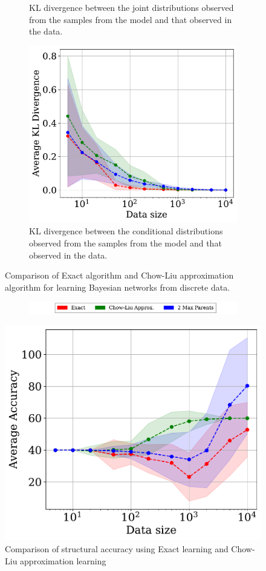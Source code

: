 \begin{figure}[htp!]
\begin{subfigure}{0.32\textwidth}
         \caption{KL divergence between the joint distributions observed from the samples from the model and that observed in the data.}
         \label{fig:kl_div_joint}
     \end{subfigure}
     \hfill
     \begin{subfigure}{0.32\textwidth}
         \centering
         \includegraphics[width=\textwidth]{plots/conditionals_kl_divergence.pdf}
         \caption{KL divergence between the conditional distributions observed from the samples from the model and that observed in the data.}
         \label{fig:kl_div_marginals}
     \end{subfigure}
        \caption{Comparison of Exact algorithm and Chow-Liu approximation algorithm for learning Bayesian networks from discrete data.}
        \label{fig:str_learning_comp}
\end{figure}

\begin{figure}[htp!]
\begin{subfigure}{0.7\textwidth}
         \centering
    \includegraphics[width=\textwidth]{plots/legends.pdf}
     \end{subfigure}
    \centering
    \includegraphics[width=0.5\linewidth]{plots/accuracy.pdf}
    \caption{Comparison of structural accuracy using Exact learning and Chow-Liu approximation learning}
    \label{fig:str_acc}
\end{figure}